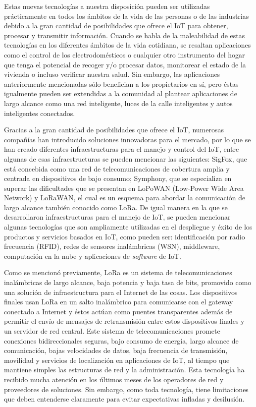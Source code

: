 Estas nuevas tecnologías a nuestra disposición pueden ser utilizadas prácticamente en todos los ámbitos de la vida de las personas o de las industrias debido a la gran cantidad de posibilidades que ofrece el IoT para obtener, procesar y transmitir información. Cuando se habla de la maleabilidad de estas tecnologías en los diferentes ámbitos de la vida cotidiana, se resaltan aplicaciones como el control de los electrodomésticos o cualquier otro instrumento del hogar que tenga el potencial de recoger y/o procesar datos, monitorear el estado de la vivienda o incluso verificar nuestra salud\cite{Alcaraz2014InternetCosas}. Sin embargo, las aplicaciones anteriormente mencionadas sólo benefician a los propietarios en sí, pero éstas igualmente pueden ser extendidas a la comunidad al plantear aplicaciones de largo alcance como una red inteligente, luces de la calle inteligentes y autos inteligentes conectados. 

Gracias a la gran cantidad de posibilidades que ofrece el IoT, numerosas compañías han introducido soluciones innovadoras para el mercado, por lo que se han creado diferentes infraestructuras para el manejo y control del IoT, entre algunas de esas infraestructuras se pueden mencionar las siguientes: SigFox, que está concebida como una red de telecomunicaciones de cobertura amplia y centrada en dispositivos de bajo consumo\cite{330ohms2018QueFunciona}; Symphony, que se especializa en superar las dificultades que se presentan en LoPoWAN (Low-Power Wide Area Network) y LoRaWAN, el cual es un esquema para abordar la comunicación de largo alcance también conocido como LoRa\cite{Singh2016ComparativeSecurity}. De igual manera en la que se desarrollaron infraestructuras para el manejo de IoT, se pueden mencionar algunas tecnologías que son ampliamente utilizadas en el despliegue y éxito de los productos y servicios basados en IoT, como pueden ser: identificación por radio frecuencia (RFID), redes de sensores inalámbricas (WSN), middleware, computación en la nube y aplicaciones de \emph{software} de IoT\cite{Lee2015TheEnterprises}. 

Como se mencionó previamente, LoRa es un sistema de telecomunicaciones inalámbricas de largo alcance, baja potencia y baja tasa de bits, promovido como una solución de infraestructura para el Internet de las cosas. Los dispositivos finales usan LoRa en un salto inalámbrico para comunicarse con el gateway conectado a Internet y éstos actúan como puentes transparentes además de permitir el envío de mensajes de retransmisión entre estos dispositivos finales y un servidor de red central\cite{Augustin2016AThings}. Este sistema de telecomunicaciones promete conexiones bidireccionales seguras, bajo consumo de energía, largo alcance de comunicación, bajas velocidades de datos, baja frecuencia de transmisión, movilidad y servicios de localización en aplicaciones de IoT, al tiempo que mantiene simples las estructuras de red y la administración\cite{LoRaAlliance2015AboutAlliance}. Esta tecnología ha recibido mucha atención en los últimos meses de los operadores de red y proveedores de soluciones. Sin embargo, como toda tecnología, tiene limitaciones que deben entenderse claramente para evitar expectativas infladas y desilusión.  

